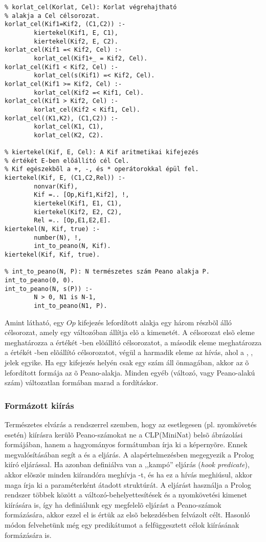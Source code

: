 \begin{verbatim}
% korlat_cel(Korlat, Cel): Korlat végrehajtható
% alakja a Cel célsorozat.
korlat_cel(Kif1=Kif2, (C1,C2)) :-
        kiertekel(Kif1, E, C1), 
        kiertekel(Kif2, E, C2). 
korlat_cel(Kif1 =< Kif2, Cel) :- 
        korlat_cel(Kif1+_ = Kif2, Cel). 
korlat_cel(Kif1 < Kif2, Cel) :- 
        korlat_cel(s(Kif1) =< Kif2, Cel). 
korlat_cel(Kif1 >= Kif2, Cel) :- 
        korlat_cel(Kif2 =< Kif1, Cel). 
korlat_cel(Kif1 > Kif2, Cel) :- 
        korlat_cel(Kif2 < Kif1, Cel). 
korlat_cel((K1,K2), (C1,C2)) :- 
        korlat_cel(K1, C1), 
        korlat_cel(K2, C2). 

% kiertekel(Kif, E, Cel): A Kif aritmetikai kifejezés 
% értékét E-ben elõállító cél Cel. 
% Kif egészekbõl a +, -, és * operátorokkal épül fel. 
kiertekel(Kif, E, (C1,C2,Rel)) :- 
        nonvar(Kif), 
        Kif =.. [Op,Kif1,Kif2], !, 
        kiertekel(Kif1, E1, C1), 
        kiertekel(Kif2, E2, C2), 
        Rel =.. [Op,E1,E2,E]. 
kiertekel(N, Kif, true) :- 
        number(N), !,  
        int_to_peano(N, Kif). 
kiertekel(Kif, Kif, true). 

% int_to_peano(N, P): N természetes szám Peano alakja P. 
int_to_peano(0, 0). 
int_to_peano(N, s(P)) :- 
        N > 0, N1 is N-1,  
        int_to_peano(N1, P).
\end{verbatim}

Amint látható, egy  $Op$  kifejezés lefordított alakja
egy három részbõl álló célsorozat, amely egy  változóban állítja
elõ a kimenetét. A célsorozat elsõ eleme meghatározza a  értékét
-ben elõállító célsorozatot, a második eleme meghatározza a
 értékét -ben elõállító célsorozatot, végül a harmadik
eleme az  hívás, ahol  a \cd{+}, \cd{-}, \cd{*}
jelek egyike. Ha egy kifejezés helyén csak egy szám áll önmagában, akkor az õ
lefordított formája az õ Peano-alakja. Minden egyéb (változó, vagy Peano-alakú
szám) változatlan formában marad a fordításkor.

\subsubsection{Formázott kiírás}

Természetes elvárás a rendszerrel szemben, hogy az esetlegesen (pl. nyomkövetés
esetén) kiírásra kerülõ Peano-számokat ne a CLP(MiniNat) belsõ ábrázolási
formájában, hanem a hagyományos formátumban írja ki a képernyõre. Ennek
megvalósításában segít a  és a  eljárás.
\br
A  alapértelmezésben megegyezik a  Prolog kiíró
eljárással. Ha azonban definiálva van a  ,,kampó'' eljárás
(\emph{hook predicate}), akkor elõször minden kiírandóra meghívja
-t, és ha ez a hívás meghiúsul, akkor maga írja ki a
paraméterként átadott struktúrát. A  eljárást használja a
Prolog rendszer többek között a változó-behelyettesítések és a nyomkövetési
kimenet kiírására is, így ha definiálunk egy megfelelõ 
eljárást a Peano-számok formázására, akkor ezzel el is értük az elsõ
bekezdésben felvázolt célt. Hasonló módon felvehetünk még egy 
predikátumot a felfüggesztett célok kiírásának formázására is.

